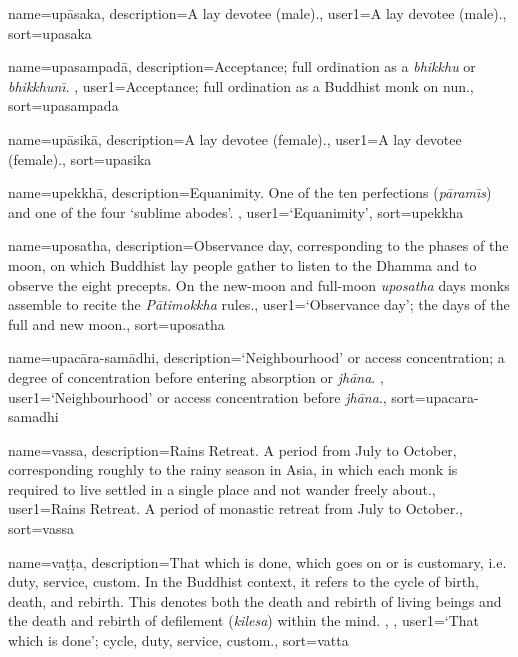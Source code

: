 {
name=up\=asaka,
description={A lay devotee (male).},
user1={A lay devotee (male).},
sort={upasaka}
}

{
name={upasampad\=a},
description={Acceptance; full ordination as a \textit{bhikkhu} or \textit{bhikkhun\={\i}}. \protect \seepre %
\protect {}%
\protect \seepost %
},
user1={Acceptance; full ordination as a Buddhist monk on nun.},
sort={upasampada}
}

{
name=up\=asik\=a,
description={A lay devotee (female).},
user1={A lay devotee (female).},
sort={upasika}
}

{
name={upekkh\=a},
description={Equanimity. One of the ten perfections (\textit{p\=aram\={\i}s}) and one of the four `sublime abodes'. \protect \seepre %
\protect {}%
\protect \seepost %
},
user1={`Equanimity'},
sort={upekkha}
}

{
name={uposatha},
description={Observance day, corresponding to the phases of the moon, on which Buddhist lay people gather to listen to the Dhamma and to observe the eight precepts. On the new-moon and full-moon \textit{uposatha} days monks assemble to recite the \textit{P\=atimokkha} rules.},
user1={`Observance day'; the days of the full and new moon.},
sort={uposatha}
}

{
name={upac\=ara-sam\=adhi},
description={`Neighbourhood' or access concentration; a degree of concentration before entering absorption or \textit{jh\=ana}. \protect \seepre %
\protect {}%
\protect \seepost %
},
user1={`Neighbourhood' or access concentration before \textit{jh\=ana}.},
sort={upacara-samadhi}
}

{
name={vassa},
description={Rains Retreat. A period from July to October, corresponding roughly to the rainy season in Asia, in which each monk is required to live settled in a single place and not wander freely about.},
user1={Rains Retreat. A period of monastic retreat from July to October.},
sort={vassa}
}

{
name={va\d{t}\d{t}a},
description={That which is done, which goes on or is customary, i.e. duty, service, custom. In the Buddhist context, it refers to the cycle of birth, death, and rebirth. This denotes both the death and rebirth of living beings and the death and rebirth of defilement (\textit{kilesa}) within the mind. \protect \seepre %
\protect {}, \protect {}%
\protect \seepost %
},
user1={`That which is done'; cycle, duty, service, custom.},
sort={vatta}
}

